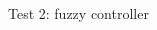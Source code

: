 \begin{multicols}{2}
            \begin{figure}[H]
                \centering
                \caption{Test 2: fuzzy controller}
                \label{fig:fuzzy_test2}
            \end{figure}

        \end{multicols}
        

\clearpage
